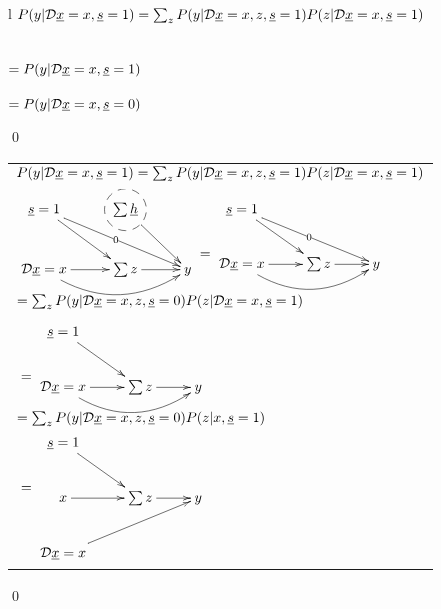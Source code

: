 \begin{claim}
\label{cl-decTransportTwo}
\decTransportTwo
\end{claim}
\proof
\begin{longtable}{l}
\color{red}
$P(y|{\cal D} {\underline{x}}=x, {\underline{s}}=1)=
\sum_ zP(y|{\cal D}{\underline{x}}=x,z,
{\underline{s}}=1)P(z|{\cal D}{\underline{x}}=x,{\underline{s}}=1)$
\\
\\
\xymatrix{\\=}
\\
\color{red}
$=P(y|{\cal D}{\underline{x}}=x,{\underline{s}}=1)$
\\
\xymatrix{\\=}
\\
\color{red}
$=P(y|{\cal D}{\underline{x}}=x,{\underline{s}}=0)$
\\
\xymatrix{=}
\end{longtable}
\qed
\begin{claim}
\label{cl-decTransportThree}
\decTransportThree
\end{claim}
\proof

\begin{longtable}{l}
\color{red}
$P(y|{\cal D}{\underline{x}}=x, {\underline{s}}=1)=
\sum_z P(y|{\cal D}{\underline{x}}=x, z, {\underline{s}}=1)
P(z|{\cal D}{\underline{x}}=x, {\underline{s}}=1)$
\\
\\
$\xymatrix{
\rvs=1\ar[rd]\ar[drr]|0
&*++[F-o]{\sum \rvh}\ar[dr]
\\
\cald\rvx=x\ar[r]
\ar@/_1.5pc/[rr]
&\sum z\ar[r]
&y
}
\xymatrix{\\=}
\xymatrix{
\rvs=1\ar[rd]\ar[drr]|0
\\
\cald\rvx=x\ar[r]
\ar@/_1.5pc/[rr]
&\sum z\ar[r]
&y
}$
\\
\\
\color{red}
$=\sum_z P(y|{\cal D}{\underline{x}}=x, z, {\underline{s}}=0)
P(z|{\cal D}{\underline{x}}=x, {\underline{s}}=1)$
\\
\\
$\xymatrix{\\=}\xymatrix{
\rvs=1\ar[rd]
\\
\cald\rvx=x\ar[r]
\ar@/_1.5pc/[rr]
&\sum z\ar[r]
&y
}$
\\
\\
\color{red}
$=\sum_z P(y|{\cal D}{\underline{x}}=x, z, {\underline{s}}=0)
P(z|x, {\underline{s}}=1)$
\\
$\xymatrix{\\=}\xymatrix{
\rvs=1\ar[rd]
\\
x\ar[r]
&\sum z\ar[r]
&y
\\
\cald\rvx=x\ar[urr]
}$
\end{longtable}
\qed



%
